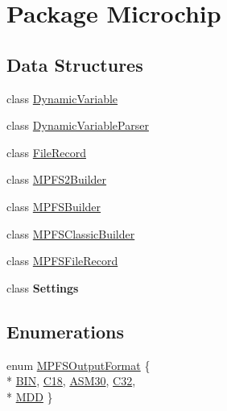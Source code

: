 \hypertarget{namespace_microchip}{}\section{Package Microchip}
\label{namespace_microchip}
\subsection*{Data Structures}
\begin{DoxyCompactItemize}
\item 
class \hyperlink{class_microchip_1_1_dynamic_variable}{Dynamic\+Variable}
\item 
class \hyperlink{class_microchip_1_1_dynamic_variable_parser}{Dynamic\+Variable\+Parser}
\item 
class \hyperlink{class_microchip_1_1_file_record}{File\+Record}
\item 
class \hyperlink{class_microchip_1_1_m_p_f_s2_builder}{M\+P\+F\+S2\+Builder}
\item 
class \hyperlink{class_microchip_1_1_m_p_f_s_builder}{M\+P\+F\+S\+Builder}
\item 
class \hyperlink{class_microchip_1_1_m_p_f_s_classic_builder}{M\+P\+F\+S\+Classic\+Builder}
\item 
class \hyperlink{class_microchip_1_1_m_p_f_s_file_record}{M\+P\+F\+S\+File\+Record}
\item 
class {\bfseries Settings}
\end{DoxyCompactItemize}
\subsection*{Enumerations}
\begin{DoxyCompactItemize}
\item 
enum \hyperlink{namespace_microchip_aa4ebbf0f9a9e92e601f6a9aac07b5e1e}{M\+P\+F\+S\+Output\+Format} \{ \\*
\hyperlink{namespace_microchip_aa4ebbf0f9a9e92e601f6a9aac07b5e1ea35d3245a21b0942070419ef6602d239e}{B\+I\+N}, 
\hyperlink{namespace_microchip_aa4ebbf0f9a9e92e601f6a9aac07b5e1eac5a230c5d9d0285421fe3ef082d6d06c}{C18}, 
\hyperlink{namespace_microchip_aa4ebbf0f9a9e92e601f6a9aac07b5e1ea14790d898c2f9d3567af1bbfc3278873}{A\+S\+M30}, 
\hyperlink{namespace_microchip_aa4ebbf0f9a9e92e601f6a9aac07b5e1ea17d740c7d2625f4b4bd439ef014d5314}{C32}, 
\\*
\hyperlink{namespace_microchip_aa4ebbf0f9a9e92e601f6a9aac07b5e1eaf6934ce135ebf1fc295d58d091a75f05}{M\+D\+D}
 \}
\end{DoxyCompactItemize}



